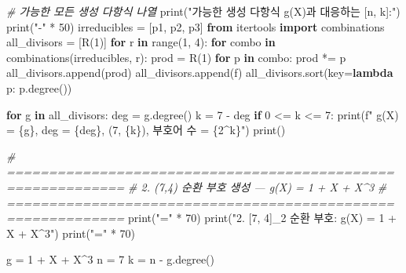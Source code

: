 \documentclass[
  oneside]{article}
\newenvironment{Shaded}{}{}
\newcommand{\BuiltInTok}[1]{\textcolor[rgb]{0.00,0.50,0.00}{#1}}
\newcommand{\CommentTok}[1]{\textcolor[rgb]{0.38,0.63,0.69}{\textit{#1}}}
\newcommand{\ControlFlowTok}[1]{\textcolor[rgb]{0.00,0.44,0.13}{\textbf{#1}}}
\newcommand{\DecValTok}[1]{\textcolor[rgb]{0.25,0.63,0.44}{#1}}
\newcommand{\ImportTok}[1]{\textcolor[rgb]{0.00,0.50,0.00}{\textbf{#1}}}
\newcommand{\KeywordTok}[1]{\textcolor[rgb]{0.00,0.44,0.13}{\textbf{#1}}}
\newcommand{\NormalTok}[1]{#1}
\newcommand{\OperatorTok}[1]{\textcolor[rgb]{0.40,0.40,0.40}{#1}}
\newcommand{\SpecialCharTok}[1]{\textcolor[rgb]{0.25,0.44,0.63}{#1}}
\newcommand{\SpecialStringTok}[1]{\textcolor[rgb]{0.73,0.40,0.53}{#1}}
\newcommand{\StringTok}[1]{\textcolor[rgb]{0.25,0.44,0.63}{#1}}
\begin{document}
\begin{Shaded}
\begin{Highlighting}[]
\CommentTok{\# 가능한 모든 생성 다항식 나열}
\BuiltInTok{print}\NormalTok{(}\StringTok{"가능한 생성 다항식 g(X)과 대응하는 [n, k]:"}\NormalTok{)}
\BuiltInTok{print}\NormalTok{(}\StringTok{"{-}"} \OperatorTok{*} \DecValTok{50}\NormalTok{)}
\NormalTok{irreducibles }\OperatorTok{=}\NormalTok{ [p1, p2, p3]}
\ImportTok{from}\NormalTok{ itertools }\ImportTok{import}\NormalTok{ combinations}
\NormalTok{all\_divisors }\OperatorTok{=}\NormalTok{ [R(}\DecValTok{1}\NormalTok{)]}
\ControlFlowTok{for}\NormalTok{ r }\KeywordTok{in} \BuiltInTok{range}\NormalTok{(}\DecValTok{1}\NormalTok{, }\DecValTok{4}\NormalTok{):}
    \ControlFlowTok{for}\NormalTok{ combo }\KeywordTok{in}\NormalTok{ combinations(irreducibles, r):}
\NormalTok{        prod }\OperatorTok{=}\NormalTok{ R(}\DecValTok{1}\NormalTok{)}
        \ControlFlowTok{for}\NormalTok{ p }\KeywordTok{in}\NormalTok{ combo:}
\NormalTok{            prod }\OperatorTok{*=}\NormalTok{ p}
\NormalTok{        all\_divisors.append(prod)}
\NormalTok{all\_divisors.append(f)}
\NormalTok{all\_divisors.sort(key}\OperatorTok{=}\KeywordTok{lambda}\NormalTok{ p: p.degree())}

\ControlFlowTok{for}\NormalTok{ g }\KeywordTok{in}\NormalTok{ all\_divisors:}
\NormalTok{    deg }\OperatorTok{=}\NormalTok{ g.degree()}
\NormalTok{    k }\OperatorTok{=} \DecValTok{7} \OperatorTok{{-}}\NormalTok{ deg}
    \ControlFlowTok{if} \DecValTok{0} \OperatorTok{\textless{}=}\NormalTok{ k }\OperatorTok{\textless{}=} \DecValTok{7}\NormalTok{:}
        \BuiltInTok{print}\NormalTok{(}\SpecialStringTok{f"  g(X) = }\SpecialCharTok{\{}\NormalTok{g}\SpecialCharTok{\}}\SpecialStringTok{,  deg = }\SpecialCharTok{\{}\NormalTok{deg}\SpecialCharTok{\}}\SpecialStringTok{,  (7, }\SpecialCharTok{\{}\NormalTok{k}\SpecialCharTok{\}}\SpecialStringTok{),  부호어 수 = }\SpecialCharTok{\{}\DecValTok{2}\OperatorTok{\^{}}\NormalTok{k}\SpecialCharTok{\}}\SpecialStringTok{"}\NormalTok{)}
\BuiltInTok{print}\NormalTok{()}

\CommentTok{\# ============================================================}
\CommentTok{\# 2. (7,4) 순환 부호 생성 — g(X) = 1 + X + X\^{}3}
\CommentTok{\# ============================================================}
\BuiltInTok{print}\NormalTok{(}\StringTok{"="} \OperatorTok{*} \DecValTok{70}\NormalTok{)}
\BuiltInTok{print}\NormalTok{(}\StringTok{"2. [7, 4]\_2 순환 부호: g(X) = 1 + X + X\^{}3"}\NormalTok{)}
\BuiltInTok{print}\NormalTok{(}\StringTok{"="} \OperatorTok{*} \DecValTok{70}\NormalTok{)}

\NormalTok{g }\OperatorTok{=} \DecValTok{1} \OperatorTok{+}\NormalTok{ X }\OperatorTok{+}\NormalTok{ X}\OperatorTok{\^{}}\DecValTok{3}
\NormalTok{n }\OperatorTok{=} \DecValTok{7}
\NormalTok{k }\OperatorTok{=}\NormalTok{ n }\OperatorTok{{-}}\NormalTok{ g.degree()}


\end{Highlighting}
\end{Shaded}
\end{document}
